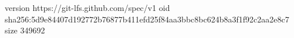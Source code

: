 version https://git-lfs.github.com/spec/v1
oid sha256:5d9e84407d192772b76877b411efd25f84aa3bbc8bc624b8a3f1f92c2aa2e8c7
size 349692
